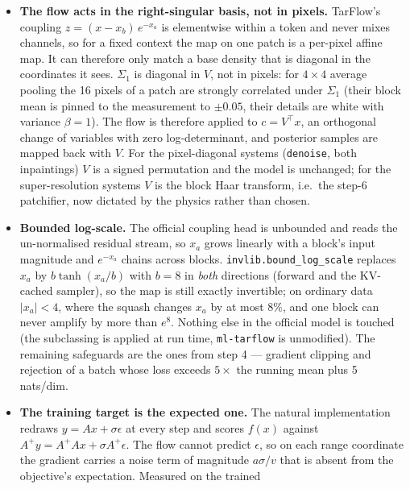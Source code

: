 \documentclass[11pt]{article}
\begin{document}
\begin{itemize}
        makes the exact Gaussian base density cheap to evaluate.
  \item \textbf{The flow acts in the right-singular basis, not in pixels.}
        TarFlow's coupling $z = (x - x_b)\,e^{-x_a}$ is elementwise within a
        token and never mixes channels, so for a fixed context the map on one
        patch is a per-pixel affine map. It can therefore only match a base
        density that is diagonal in the coordinates it sees. $\Sigma_1$ is
        diagonal in $V$, not in pixels: for $4\times4$ average pooling the 16
        pixels of a patch are strongly correlated under $\Sigma_1$ (their
        block mean is pinned to the measurement to $\pm 0.05$, their details
        are white with variance $\beta = 1$). The flow is therefore applied
        to $c = V^\top x$, an orthogonal change of variables with zero
        log-determinant, and posterior samples are mapped back with $V$. For
        the pixel-diagonal systems (\texttt{denoise}, both inpaintings) $V$
        is a signed permutation and the model is unchanged; for the
        super-resolution systems $V$ is the block Haar transform, i.e.\ the
        step-6 patchifier, now dictated by the physics rather than chosen.
  \item \textbf{Bounded log-scale.} The official coupling head is unbounded
        and reads the un-normalised residual stream, so $x_a$ grows linearly
        with a block's input magnitude and $e^{-x_a}$ chains across blocks.
        \texttt{invlib.bound\_log\_scale} replaces $x_a$ by
        $b\tanh(x_a/b)$ with $b = 8$ in \emph{both} directions (forward and
        the KV-cached sampler), so the map is still exactly invertible; on
        ordinary data $|x_a| < 4$, where the squash changes $x_a$ by at most
        8\%, and one block can never amplify by more than $e^{8}$. Nothing
        else in the official model is touched (the subclassing is applied at
        run time, \texttt{ml-tarflow} is unmodified). The remaining
        safeguards are the ones from step 4 --- gradient clipping and
        rejection of a batch whose loss exceeds $5\times$ the running mean
        plus 5 nats/dim.
  \item \textbf{The training target is the expected one.} The natural
        implementation redraws $y = Ax + \sigma\epsilon$ at every step and
        scores $f(x)$ against $A^{+}y = A^{+}Ax + \sigma A^{+}\epsilon$. The
        flow cannot predict $\epsilon$, so on each range coordinate the
        gradient carries a noise term of magnitude $a\sigma/v$ that is
        absent from the objective's expectation. Measured on the trained

\end{itemize}
\end{document}
